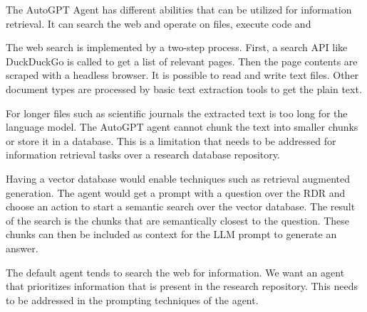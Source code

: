 \documentclass[../main.tex]{subfiles}
\begin{document}
The AutoGPT Agent has different abilities that can be utilized for information retrieval.
It can search the web and operate on files, execute code and

The web search is implemented by a two-step process.
First, a search API like DuckDuckGo is called to get a list of relevant pages.
Then the page contents are scraped with a headless browser.
It is possible to read and write text files.
Other document types are processed by basic text extraction tools to get the plain text.

For longer files such as scientific journals the extracted text is too long for the language model.
The AutoGPT agent cannot chunk the text into smaller chunks or store it in a database.
This is a limitation that needs to be addressed for information retrieval tasks over a research database repository.

Having a vector database would enable techniques such as retrieval augmented generation.
The agent would get a prompt with a question over the RDR and choose an action to start a semantic search over the vector database.
The result of the search is the chunks that are semantically closest to the question.
These chunks can then be included as context for the LLM prompt to generate an answer.

The default agent tends to search the web for information. We want an agent that prioritizes information that is present in the research repository.
This needs to be addressed in the prompting techniques of the agent.
\end{document}
